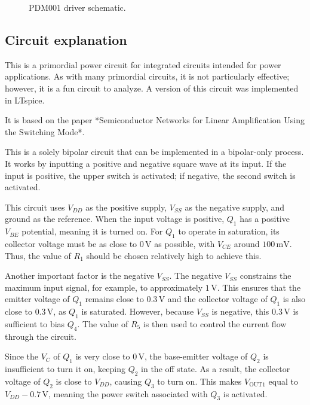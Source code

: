 \documentclass[12pt]{article}
\begin{document}
\begin{figure}[H]
        \centering
        
        \caption{PDM001 driver schematic.}
        \label{PDM001}
\end{figure}


\subsection{Circuit explanation}

This is a primordial power circuit for integrated circuits intended for power applications. As with many primordial circuits, it is not particularly effective; however, it is a fun circuit to analyze.  
A version of this circuit was implemented in LTspice.  

It is based on the paper *Semiconductor Networks for Linear Amplification Using the Switching Mode*.  

This is a solely bipolar circuit that can be implemented in a bipolar-only process. It works by inputting a positive and negative square wave at its input. If the input is positive, the upper switch is activated; if negative, the second switch is activated.  

This circuit uses $V_{DD}$ as the positive supply, $V_{SS}$ as the negative supply, and ground as the reference. When the input voltage is positive, $Q_1$ has a positive $V_{BE}$ potential, meaning it is turned on. For $Q_1$ to operate in saturation, its collector voltage must be as close to $0 \, \text{V}$ as possible, with $V_{CE}$ around $100 \, \text{mV}$. Thus, the value of $R_1$ should be chosen relatively high to achieve this.  

Another important factor is the negative $V_{SS}$. The negative $V_{SS}$ constrains the maximum input signal, for example, to approximately $1 \, \text{V}$. This ensures that the emitter voltage of $Q_1$ remains close to $0.3 \, \text{V}$ and the collector voltage of $Q_1$ is also close to $0.3 \, \text{V}$, as $Q_1$ is saturated. However, because $V_{SS}$ is negative, this $0.3 \, \text{V}$ is sufficient to bias $Q_4$. The value of $R_5$ is then used to control the current flow through the circuit.  

Since the $V_C$ of $Q_1$ is very close to $0 \, \text{V}$, the base-emitter voltage of $Q_2$ is insufficient to turn it on, keeping $Q_2$ in the off state. As a result, the collector voltage of $Q_2$ is close to $V_{DD}$, causing $Q_3$ to turn on. This makes $V_{\text{OUT1}}$ equal to $V_{DD} - 0.7 \, \text{V}$, meaning the power switch associated with $Q_3$ is activated.  
\end{document}
